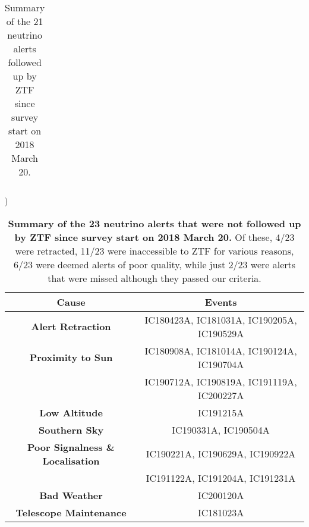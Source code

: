 \begin{table*}
\begin{tabular}{||c c c c c c c ||}
		\hline
	\end{tabular}
	\caption{Summary of the 21 neutrino alerts followed up by ZTF since survey start on 2018 March 20.}
	\label{tab:nu_alerts}
\end{table*})

 
 \begin{table*}
 	\centering
 	\begin{tabular}{||c c ||} 
 		\hline
 		\textbf{Cause} & \textbf{Events} \\
 		\hline
 		\textbf{Alert Retraction} & IC180423A\cite{ic180423a}, IC181031A\cite{ic181031a}, IC190205A\cite{ic190205a}, IC190529A\cite{ic190529a}\\
 		\hline
 		\textbf{Proximity to Sun} &IC180908A\cite{ic180908a}, IC181014A\cite{ic181014a}, IC190124A\cite{ic190124a}, IC190704A\cite{ic190704a}\\
 		& IC190712A\cite{ic190712a}, IC190819A\cite{ic190819a}, IC191119A\cite{ic191119a}, IC200227A\cite{ic200227a}\\
 		\textbf{Low Altitude} & IC191215A\cite{ic191215a}\\
 		\textbf{Southern Sky} & IC190331A\cite{ic190331a}, IC190504A\cite{ic190504a}\\
 		\hline
 		\textbf{Poor Signalness \& Localisation} &
 		IC190221A\cite{ic190221a}, IC190629A\cite{ic190629a}, IC190922A\cite{ic190922a}\\
 		& IC191122A\cite{ic191122a}, IC191204A\cite{ic191204a}, IC191231A\cite{ic191231a}\\
 		\hline
 		\textbf{Bad Weather} & IC200120A\cite{ic200120a,ic200120a_2}\\
 		\textbf{Telescope Maintenance} & IC181023A\cite{ic181023a}\\
 		\hline
 	\end{tabular}
 	\caption{\textbf{Summary of the 23 neutrino alerts that were not followed up by ZTF since survey start on 2018 March 20.} Of these, 4/23 were retracted, 11/23 were inaccessible to ZTF for various reasons, 6/23 were deemed alerts of poor quality, while just 2/23 were alerts that were missed although they passed our criteria.}
 	\label{tab:nu_non_observed_old}
 \end{table*}

